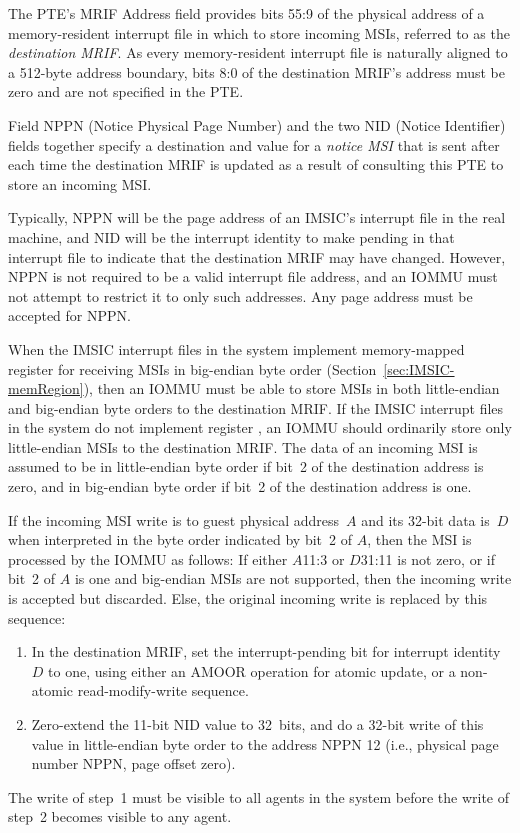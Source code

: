 The PTE's MRIF Address field provides bits 55:9 of the physical address
of a memory-resident interrupt file in which to store incoming MSIs,
referred to as the \emph{destination MRIF}.
As every memory-resident interrupt file is naturally aligned to a
\mbox{512-byte} address boundary, bits 8:0 of the destination MRIF's
address must be zero and are not specified in the PTE.

Field NPPN (Notice Physical Page Number) and the two NID
(Notice Identifier) fields together specify a destination and value for
a \emph{notice MSI} that is sent after each time the destination MRIF
is updated as a result of consulting this PTE to store an incoming MSI.

\begin{commentary}
Typically, NPPN will be the page address of an IMSIC's interrupt file
in the real machine, and NID will be the interrupt identity to make
pending in that interrupt file to indicate that the destination MRIF
may have changed.
However, NPPN is not required to be a valid interrupt file address, and
an \mbox{IOMMU} must not attempt to restrict it to only such addresses.
Any page address must be accepted for NPPN.
\end{commentary}

When the IMSIC interrupt files in the system implement memory-mapped
register  for receiving MSIs in big-endian byte order
(Section~\ref{sec:IMSIC-memRegion}), then an \mbox{IOMMU} must be able to
store MSIs in both little-endian and big-endian byte orders to the
destination MRIF.
If the IMSIC interrupt files in the system do not implement
register , an \mbox{IOMMU} should ordinarily store only
little-endian MSIs to the destination MRIF.
The data of an incoming MSI is assumed to be in little-endian byte
order if bit~2 of the destination address is zero, and in big-endian
byte order if bit~2 of the destination address is one.

If the incoming MSI write is to guest physical address~$A$ and its
\mbox{32-bit} data is~$D$ when interpreted in the byte order indicated
by bit~2 of $A$, then the MSI is processed by the \mbox{IOMMU} as follows:
If either $A$\z{[}11:3\z{]} or $D$\z{[}31:11\z{]} is not zero, or if
bit~2 of $A$ is one and big-endian MSIs are not supported, then the
incoming write is accepted but discarded.
Else, the original incoming write is replaced by this sequence:
\begin{enumerate}

\item
In the destination MRIF, set the interrupt-pending bit for interrupt
identity $D$ to one, using either an AMOOR operation for atomic update,
or a non-atomic read-modify-write sequence.

\item
Zero-extend the \mbox{11-bit} NID value to 32~bits, and do a
\mbox{32-bit} write of this value in little-endian byte order to the
address NPPN\,\z{<<}\,12 (i.e., physical page number NPPN, page offset
zero).

\end{enumerate}
The write of step~1 must be visible to all agents in the system before
the write of step~2 becomes visible to any agent.

